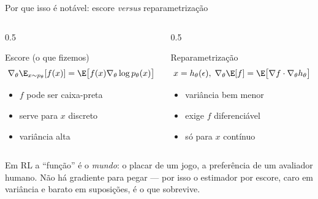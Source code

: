 \documentclass[aspectratio=169, 11pt]{beamer}
\newcommand{\thv}{\theta}                       %
\newcommand{\gth}{\nabla_{\thv}}                %
\begin{document}
\begin{frame}{Por que isso é notável: escore \emph{versus} reparametrização}

  \begin{columns}[T]
  \begin{column}{0.5\textwidth}
    \begin{defbox}{Escore (o que fizemos)}
      \vspace{-0.8em}
      \[ \gth \E_{x\sim p_{\thv}}[f(x)] = \E\bigl[f(x)\gth \log p_{\thv}(x)\bigr] \]
      \vspace{-1.6em}
      \begin{itemize}\setlength{\itemsep}{0.1ex}
        \item[$+$] $f$ pode ser caixa-preta
        \item[$+$] serve para $x$ discreto
        \item[$-$] variância alta
      \end{itemize}
    \end{defbox}
  \end{column}
  \begin{column}{0.5\textwidth}
    \begin{defbox}{Reparametrização}
      \vspace{-0.8em}
      \[ x = h_{\thv}(\epsilon),\; \gth \E[f] = \E\bigl[\nabla f \cdot \gth h_{\thv}\bigr] \]
      \vspace{-1.6em}
      \begin{itemize}\setlength{\itemsep}{0.1ex}
        \item[$+$] variância bem menor
        \item[$-$] exige $f$ diferenciável
        \item[$-$] só para $x$ contínuo
      \end{itemize}
    \end{defbox}
  \end{column}
  \end{columns}

  \begin{ideiabox}
    Em RL a ``função'' é o \emph{mundo}: o placar de um jogo, a preferência de
    um avaliador humano. Não há gradiente para pegar --- por isso o estimador
    por escore, caro em variância e barato em suposições, é o que sobrevive.
  \end{ideiabox}
\end{frame}
\end{document}
